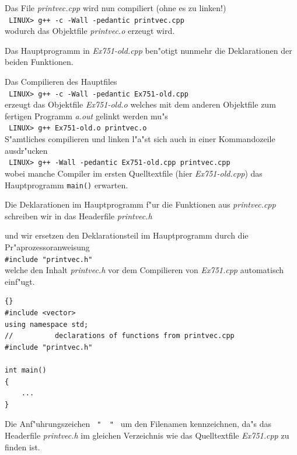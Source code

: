 Das File \textit{printvec.cpp} wird nun compiliert (ohne es zu linken!)
\\[0.5ex]
\verb| LINUX> g++ -c -Wall -pedantic printvec.cpp |
\\[0.5ex]
wodurch das Objektfile \textit{printvec.o} erzeugt wird.

Das Hauptprogramm in \mbox{\textit{Ex751-old.cpp}}
ben"otigt nunmehr die Deklarationen der beiden Funktionen.

%
Das  Compilieren des Hauptfiles
\\[0.2ex]
\verb| LINUX> g++ -c -Wall -pedantic Ex751-old.cpp |
\\[0.2ex]
erzeugt das Objektfile \textit{Ex751-old.o} welches
mit dem anderen Objektfile zum fertigen Programm \textit{a.out}
gelinkt werden mu"s
\\[0.2ex]
\verb| LINUX> g++ Ex751-old.o printvec.o |
\\[0.2ex]
S"amtliches compilieren und linken l"a"st sich auch in einer
Kommandozeile ausdr"ucken
\\[0.2ex]
\verb| LINUX> g++ -Wall -pedantic Ex751-old.cpp printvec.cpp |
\\[0.2ex]
wobei manche Compiler im ersten Quelltextfile (hier \textit{Ex751-old.cpp})
das Hauptprogramm \texttt{main()} erwarten.

Die Deklarationen im Hauptprogramm  f"ur die Funktionen aus
\textit{printvec.cpp} schreiben wir in das Headerfile
\textit{printvec.h}


und wir ersetzen den Deklarationsteil im Hauptprogramm durch die
Pr"aprozessoranweisung
\\[0.2ex]
\verb|#include "printvec.h"|
\\[0.2ex]
welche den Inhalt \textit{printvec.h} vor dem Compilieren von
\textit{Ex751.cpp} 
automatisch einf"ugt.

\begin{lstlisting}[caption=Hauptprogramm mit Headerfile,label=lst:7_6_4,basicstyle=\scriptsize]{}
#include <vector>
using namespace std;
//			declarations of functions from printvec.cpp
#include "printvec.h"

int main()
{
    ...
}
\end{lstlisting}
Die Anf"uhrungszeichen  \verb| "  " |  um den Filenamen
kennzeichnen, da"s das Headerfile \textit{printvec.h}
im gleichen Verzeichnis wie das Quelltextfile \textit{Ex751.cpp}
zu finden ist.

